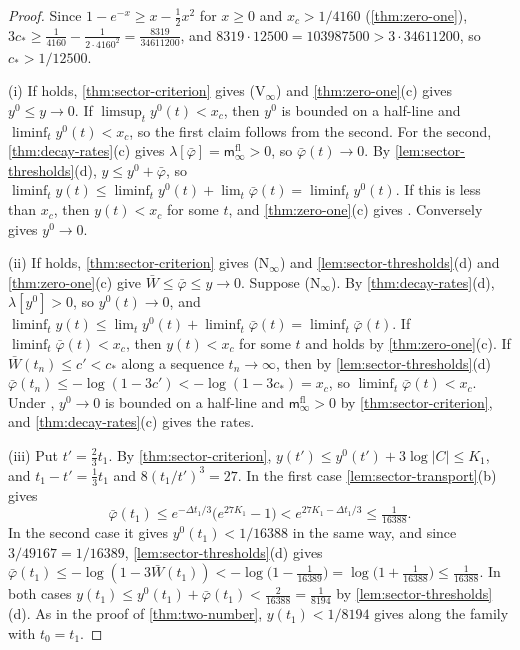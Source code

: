 \documentclass[11pt,a4paper]{amsart}
\theoremstyle{definition}
\theoremstyle{remark}
\numberwithin{equation}{section}
\newcommand{\abs}[1]{\lvert #1\rvert}      %
\newcommand{\Mcirc}{\text{\upshape(M$^{\circ}$)}}   %
\newcommand{\tzero}{t_0}                   %
\begin{document}
\begin{proof}
Since $1-e^{-x}\ge x-\frac12x^2$ for $x\ge0$ and $x_c>1/4160$ (\cref{thm:zero-one}), $3c_*\ge\frac1{4160}-\frac1{2\cdot4160^2}=\frac{8319}{34611200}$, and $8319\cdot12500=103987500>3\cdot34611200$, so $c_*>1/12500$.

(i) If \Mcirc{} holds, \cref{thm:sector-criterion} gives \textup{(V$_\infty$)} and \cref{thm:zero-one}\textup{(c)} gives $y^0\le y\to0$. If $\limsup_ty^0(t)<x_c$, then $y^0$ is bounded on a half-line and $\liminf_ty^0(t)<x_c$, so the first claim follows from the second. For the second, \cref{thm:decay-rates}\textup{(c)} gives $\lambda[\bar\varphi]=\mathsf m^{\mathrm{fl}}_\infty>0$, so $\bar\varphi(t)\to0$. By \cref{lem:sector-thresholds}\textup{(d)}, $y\le y^0+\bar\varphi$, so $\liminf_ty(t)\le\liminf_ty^0(t)+\lim_t\bar\varphi(t)=\liminf_ty^0(t)$. If this is less than $x_c$, then $y(t)<x_c$ for some $t$, and \cref{thm:zero-one}\textup{(c)} gives \Mcirc{}. Conversely \Mcirc{} gives $y^0\to0$.

(ii) If \Mcirc{} holds, \cref{thm:sector-criterion} gives \textup{(N$_\infty$)} and \cref{lem:sector-thresholds}\textup{(d)} and \cref{thm:zero-one}\textup{(c)} give $\bar W\le\bar\varphi\le y\to0$. Suppose \textup{(N$_\infty$)}. By \cref{thm:decay-rates}\textup{(d)}, $\lambda[y^0]>0$, so $y^0(t)\to0$, and $\liminf_ty(t)\le\lim_ty^0(t)+\liminf_t\bar\varphi(t)=\liminf_t\bar\varphi(t)$. If $\liminf_t\bar\varphi(t)<x_c$, then $y(t)<x_c$ for some $t$ and \Mcirc{} holds by \cref{thm:zero-one}\textup{(c)}. If $\bar W(t_n)\le c'<c_*$ along a sequence $t_n\to\infty$, then by \cref{lem:sector-thresholds}\textup{(d)} $\bar\varphi(t_n)\le-\log(1-3c')<-\log(1-3c_*)=x_c$, so $\liminf_t\bar\varphi(t)<x_c$. Under \Mcirc{}, $y^0\to0$ is bounded on a half-line and $\mathsf m^{\mathrm{fl}}_\infty>0$ by \cref{thm:sector-criterion}, and \cref{thm:decay-rates}\textup{(c)} gives the rates.

(iii) Put $t'=\frac23t_1$. By \cref{thm:sector-criterion}, $y(t')\le y^0(t')+3\log\abs{C}\le K_1$, and $t_1-t'=\frac13t_1$ and $8(t_1/t')^3=27$. In the first case \cref{lem:sector-transport}\textup{(b)} gives
\[
\bar\varphi(t_1)\le e^{-\Delta t_1/3}\bigl(e^{27K_1}-1\bigr)<e^{27K_1-\Delta t_1/3}\le\tfrac1{16388}.
\]
In the second case it gives $y^0(t_1)<1/16388$ in the same way, and since $3/49167=1/16389$, \cref{lem:sector-thresholds}\textup{(d)} gives $\bar\varphi(t_1)\le-\log(1-3\bar W(t_1))<-\log\bigl(1-\frac1{16389}\bigr)=\log\bigl(1+\frac1{16388}\bigr)\le\frac1{16388}$. In both cases $y(t_1)\le y^0(t_1)+\bar\varphi(t_1)<\frac2{16388}=\frac1{8194}$ by \cref{lem:sector-thresholds}\textup{(d)}. As in the proof of \cref{thm:two-number}, $y(t_1)<1/8194$ gives \Mcirc{} along the family with $\tzero=t_1$.
\end{proof}
\end{document}
